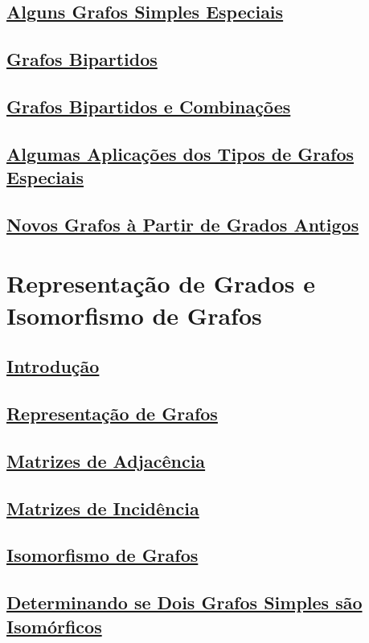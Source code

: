 \subsection*{\underline{Alguns Grafos Simples Especiais}}
\subsection*{\underline{Grafos Bipartidos}}
\subsection*{\underline{Grafos Bipartidos e Combinações}}
\subsection*{\underline{Algumas Aplicações dos Tipos de Grafos Especiais}}
\subsection*{\underline{Novos Grafos à Partir de Grados Antigos}}

\section{Representação de Grados e Isomorfismo de Grafos}
\subsection*{\underline{Introdução}}
\subsection*{\underline{Representação de Grafos}}
\subsection*{\underline{Matrizes de Adjacência}}
\subsection*{\underline{Matrizes de Incidência}}
\subsection*{\underline{Isomorfismo de Grafos}}
\subsection*{\underline{Determinando se Dois Grafos Simples são Isomórficos}}

